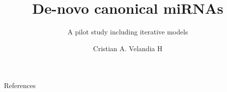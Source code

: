 \documentclass{beamer}
\title{De-novo canonical miRNAs}
\subtitle{A pilot study including iterative models}
\author{Cristian A. Velandia H}
\institute{TBI \\ University of Vienna}
\date{}
\begin{document}
\begin{frame}
    \maketitle
\end{frame}

%
%
%
%
%
%
%
%




\begin{frame}{References}
    \printbibliography
\end{frame}
\end{document}
